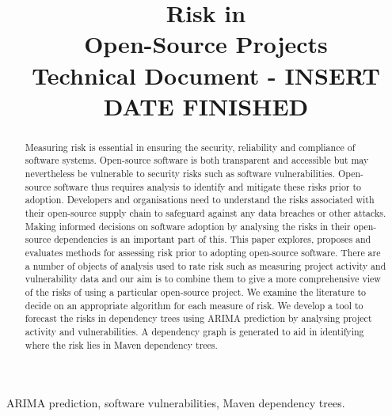 \documentclass[conference]{IEEEtran}
\begin{document}
\title{Risk in \\Open-Source Projects\\
{\footnotesize Technical Document - INSERT DATE FINISHED}
}

\author{
\and
{}
    }

\maketitle
\thispagestyle{plain}
\pagestyle{plain}

\begin{abstract}
Measuring risk is essential in ensuring the security, reliability and compliance of software systems. Open-source software is both transparent and accessible but may nevertheless be vulnerable to security risks such as software vulnerabilities. Open-source software thus requires analysis to identify and mitigate these risks prior to adoption. Developers and organisations need to understand the risks associated with their open-source supply chain to safeguard against any data breaches or other attacks. Making informed decisions on software adoption by analysing the risks in their open-source dependencies is an important part of this. This paper explores, proposes and evaluates methods for assessing risk prior to adopting open-source software. There are a number of objects of analysis used to rate risk such as measuring project activity and vulnerability data and our aim is to combine them to give a more comprehensive view of the risks of using a particular open-source project. We examine the literature to decide on an appropriate algorithm for each measure of risk. We develop a tool to forecast the risks in dependency trees using ARIMA prediction by analysing project activity and vulnerabilities. A dependency graph is generated to aid in identifying where the risk lies in Maven dependency trees. 
\end{abstract}

\begin{IEEEkeywords}
ARIMA prediction, software vulnerabilities, Maven dependency trees.
\end{IEEEkeywords}
\end{document}
